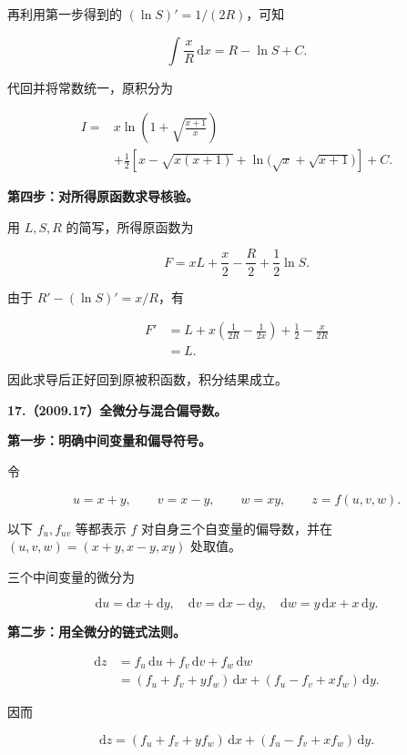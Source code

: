\documentclass[UTF8,11pt,fontset=windows]{ctexart}
\begin{document}
再利用第一步得到的 $(\ln S)'=1/(2R)$，可知

$$
\int\frac{x}{R}\,\mathrm dx=R-\ln S+C.
$$

代回并将常数统一，原积分为

$$
\begin{aligned}
I={}&x\ln\left(1+\sqrt{\frac{x+1}{x}}\right)\\
&+\frac12\left[x-\sqrt{x(x+1)}
+\ln\bigl(\sqrt{x}+\sqrt{x+1}\bigr)\right]+C.
\end{aligned}
$$

\textbf{第四步：对所得原函数求导核验。}

用 $L,S,R$ 的简写，所得原函数为

$$
F=xL+\frac x2-\frac R2+\frac12\ln S.
$$

由于 $R'-(\ln S)'=x/R$，有

$$
\begin{aligned}
F'&=L+x\left(\frac1{2R}-\frac1{2x}\right)
+\frac12-\frac{x}{2R}\\
&=L.
\end{aligned}
$$

因此求导后正好回到原被积函数，积分结果成立。

\clearpage

\textbf{17.（2009.17）全微分与混合偏导数。}

\textbf{第一步：明确中间变量和偏导符号。}

令

$$
u=x+y,\qquad v=x-y,\qquad w=xy,
\qquad z=f(u,v,w).
$$

以下 $f_u,f_{uv}$ 等都表示 $f$ 对自身三个自变量的偏导数，并在 $(u,v,w)=(x+y,x-y,xy)$ 处取值。

三个中间变量的微分为

$$
\mathrm du=\mathrm dx+\mathrm dy,
\quad\mathrm dv=\mathrm dx-\mathrm dy,
\quad\mathrm dw=y\,\mathrm dx+x\,\mathrm dy.
$$

\textbf{第二步：用全微分的链式法则。}

$$
\begin{aligned}
\mathrm dz
&=f_u\,\mathrm du+f_v\,\mathrm dv+f_w\,\mathrm dw\\
&=(f_u+f_v+yf_w)\,\mathrm dx
+(f_u-f_v+xf_w)\,\mathrm dy.
\end{aligned}
$$

因而

$$
\boxed{\mathrm dz=(f_u+f_v+yf_w)\,\mathrm dx
+(f_u-f_v+xf_w)\,\mathrm dy}.
$$
\end{document}
